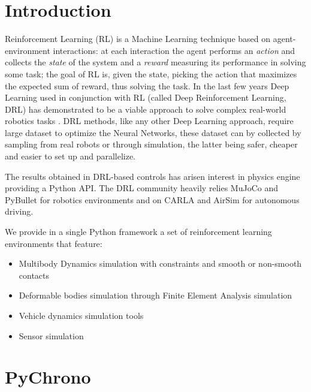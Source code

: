 \documentclass{svproc}
\begin{document}


\section{Introduction}

Reinforcement Learning (RL) \cite{SuttonBarto1998RL}  is a Machine Learning technique based on agent-environment interactions: at each interaction the agent performs an \textit{action} and collects the \textit{state} of the system and a \textit{reward} measuring its performance in solving some task; the goal of RL is, given the state, picking the action that maximizes the expected sum of reward, thus solving the task. In the last few years \cite{Mnih13} Deep Learning used in conjunction with RL (called Deep Reinforcement Learning, DRL) has demonstrated to be a viable approach to solve complex real-world robotics tasks \cite{openai2018HandManipulation}. DRL methods, like any other Deep Learning approach, require large dataset to optimize the Neural Networks, these dataset can by collected by sampling from real robots or through simulation, the latter being safer, cheaper and easier to set up and parallelize.

The results obtained in DRL-based controls has arisen interest in physics engine providing a Python API. The DRL community heavily relies MuJoCo \cite{todorovMujoco2012} and PyBullet \cite{bulletPhysicsEngine2020}
for robotics environments and on CARLA \cite{carlaAVsim2017} and AirSim \cite{shah2018airsim}for autonomous driving.

We provide in a single Python framework a set of reinforcement learning environments that feature:
\begin{itemize}
    \item Multibody Dynamics simulation with constraints and smooth or non-smooth contacts
    \item Deformable bodies simulation through Finite Element Analysis simulation
    \item Vehicle dynamics simulation tools
    \item Sensor simulation
\end{itemize}

\section{PyChrono}
\end{document}
